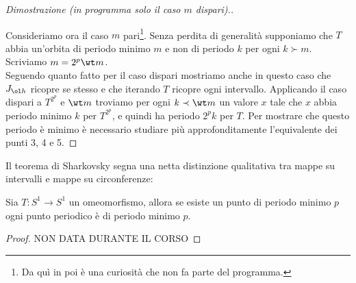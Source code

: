\begin{proof}[Dimostrazione (in programma solo il caso $m$ dispari).]
\begin{enumerate}
\end{enumerate}
Consideriamo ora il caso $m$ pari\footnote{Da qu\`i in poi \`e una curiosit\`a che non fa parte del programma.}.
Senza perdita di generalit\`a supponiamo che $T$ abbia un'orbita di periodo minimo $m$ e non di periodo $k$ per ogni $k\succ m$. Scriviamo $m=2^p\wt m$.\\
Seguendo quanto fatto per il caso dispari mostriamo anche in questo caso che $J_{\ol h}$ ricopre se stesso e che iterando $T$ ricopre ogni intervallo. Applicando il caso dispari a $T^{2^p}$ e $\wt m$ troviamo per ogni $k\prec \wt m$ un valore $x$ tale che $x$ abbia periodo minimo $k$ per $T^{2^p}$, e quindi ha periodo $2^pk$ per $T$. Per mostrare che questo periodo \`e minimo \`e necessario studiare pi\`u approfonditamente l'equivalente dei punti 3, 4 e 5.
\end{proof}

Il teorema di Sharkovsky segna una netta distinzione qualitativa tra mappe su intervalli e mappe su circonferenze:

\begin{proposition}
Sia $T:S^1\to S^1$ un omeomorfismo, allora se esiste un punto di periodo minimo $p$ ogni punto periodico \`e di periodo minimo $p$.
\end{proposition}
\begin{proof}
NON DATA DURANTE IL CORSO
\end{proof}